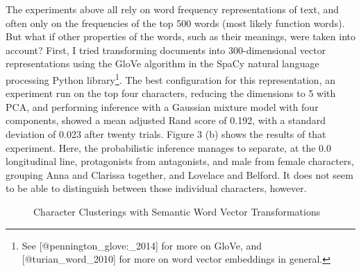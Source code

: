 \documentclass[12pt]{article}
\begin{document}
The experiments above all rely on word frequency representations of
text, and often only on the frequencies of the top 500 words (most
likely function words). But what if other properties of the words, such
as their meanings, were taken into account? First, I tried transforming
documents into 300-dimensional vector representations using the GloVe
algorithm in the SpaCy natural language processing Python
library\footnote{See {[}@pennington\_glove:\_2014{]} for more on GloVe,
  and {[}@turian\_word\_2010{]} for more on word vector embeddings in
  general.}. The best configuration for this representation, an
experiment run on the top four characters, reducing the dimensions to 5
with PCA, and performing inference with a Gaussian mixture model with
four components, showed a mean adjusted Rand score of 0.192, with a
standard deviation of 0.023 after twenty trials. Figure 3 (b) shows the
results of that experiment. Here, the probabilistic inference manages to
separate, at the 0.0 longitudinal line, protagonists from antagonists,
and male from female characters, grouping Anna and Clarissa together,
and Lovelace and Belford. It does not seem to be able to distinguish
between those individual characters, however.

\begin{figure}
\centering   
{}
\caption{Character Clusterings with Semantic Word Vector Transformations}
\end{figure}
\end{document}
